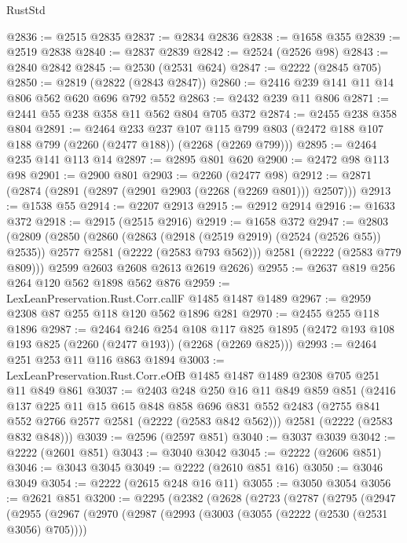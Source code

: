 \begin{lexlean}{RustStd}
\begin{coremodule}
@2836 := @2515 @2835
@2837 := @2834 @2836
@2838 := @1658 @355
@2839 := @2519 @2838
@2840 := @2837 @2839
@2842 := @2524 (@2526 @98)
@2843 := @2840 @2842
@2845 := @2530 (@2531 @624)
@2847 := @2222 (@2845 @705)
@2850 := @2819 (@2822 (@2843 @2847))
@2860 := @2416 @239 @141 @11 @14 @806 @562 @620 @696 @792 @552
@2863 := @2432 @239 @11 @806
@2871 := @2441 @55 @238 @358 @11 @562 @804 @705 @372
@2874 := @2455 @238 @358 @804
@2891 := @2464
    @233
    @237
    @107
    @115
    @799
    @803
    (@2472 @188 @107 @188 @799 (@2260 (@2477 @188)) (@2268 (@2269 @799)))
@2895 := @2464 @235 @141 @113 @14
@2897 := @2895 @801 @620
@2900 := @2472 @98 @113 @98
@2901 := @2900 @801
@2903 := @2260 (@2477 @98)
@2912 := @2871 (@2874 (@2891 (@2897 (@2901 @2903 (@2268 (@2269 @801))) @2507)))
@2913 := @1538 @55
@2914 := @2207 @2913
@2915 := @2912 @2914
@2916 := @1633 @372
@2918 := @2915 (@2515 @2916)
@2919 := @1658 @372
@2947 := @2803
    (@2809
      (@2850
        (@2860
          (@2863 (@2918 (@2519 @2919) (@2524 (@2526 @55)) @2535))
          @2577
          @2581
          (@2222 (@2583 @793 @562)))
        @2581
        (@2222 (@2583 @779 @809)))
      @2599
      @2603
      @2608
      @2613
      @2619
      @2626)
@2955 := @2637 @819 @256 @264 @120 @562 @1898 @562 @876
@2959 := LexLeanPreservation.Rust.Corr.callF @1485 @1487 @1489
@2967 := @2959 @2308 @87 @255 @118 @120 @562 @1896 @281
@2970 := @2455 @255 @118 @1896
@2987 := @2464
    @246
    @254
    @108
    @117
    @825
    @1895
    (@2472 @193 @108 @193 @825 (@2260 (@2477 @193)) (@2268 (@2269 @825)))
@2993 := @2464 @251 @253 @11 @116 @863 @1894
@3003 := LexLeanPreservation.Rust.Corr.eOfB @1485 @1487 @1489 @2308 @705 @251 @11 @849 @861
@3037 := @2403
    @248
    @250
    @16
    @11
    @849
    @859
    @851
    (@2416
      @137
      @225
      @11
      @15
      @615
      @848
      @858
      @696
      @831
      @552
      @2483
      (@2755 @841 @552 @2766 @2577 @2581 (@2222 (@2583 @842 @562)))
      @2581
      (@2222 (@2583 @832 @848)))
@3039 := @2596 (@2597 @851)
@3040 := @3037 @3039
@3042 := @2222 (@2601 @851)
@3043 := @3040 @3042
@3045 := @2222 (@2606 @851)
@3046 := @3043 @3045
@3049 := @2222 (@2610 @851 @16)
@3050 := @3046 @3049
@3054 := @2222 (@2615 @248 @16 @11)
@3055 := @3050 @3054
@3056 := @2621 @851
@3200 := @2295
    (@2382
      (@2628
        (@2723
          (@2787
            (@2795
              (@2947
                (@2955
                  (@2967
                    (@2970
                      (@2987
                        (@2993
                          (@3003 (@3055 (@2222 (@2530 (@2531 @3056) @705))))

\end{coremodule}
\end{lexlean}
